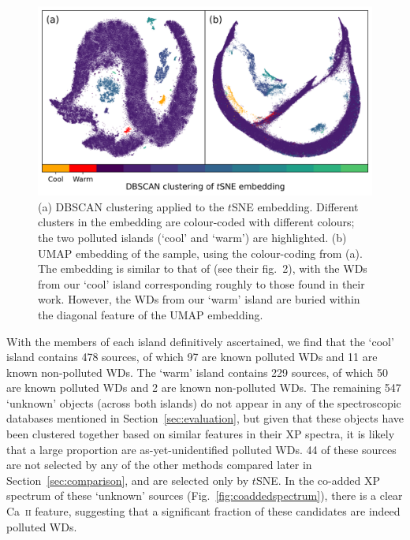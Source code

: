 \documentclass[fleqn,usenatbib]{rasti}
\begin{document}
\begin{figure}
\centering
\includegraphics[width=\textwidth]{figures/fig2_tsneclustering.png}
\caption{
    (a) DBSCAN clustering applied to the $t$SNE embedding.
    Different clusters in the embedding are colour-coded with different colours; the two polluted islands (`cool' and `warm') are highlighted.
    (b) UMAP embedding of the sample, using the colour-coding from (a).
    The embedding is similar to that of \citet{kao24} (see their fig.~2), with the WDs from our `cool' island corresponding roughly to those found in their work.
    However, the WDs from our `warm' island are buried within the diagonal feature of the UMAP embedding.
}
\label{fig:tsneclustering}
\end{figure}

With the members of each island definitively ascertained, we find that the `cool' island contains 478 sources, of which 97 are known polluted WDs and 11 are known non-polluted WDs.
The `warm' island contains 229 sources, of which 50 are known polluted WDs and 2 are known non-polluted WDs.
The remaining 547 `unknown' objects (across both islands) do not appear in any of the spectroscopic databases mentioned in Section~\ref{sec:evaluation}, but given that these objects have been clustered together based on similar features in their XP spectra, it is likely that a large proportion are as-yet-unidentified polluted WDs.
44 of these sources are not selected by any of the other methods compared later in Section~\ref{sec:comparison}, and are selected only by $t$SNE.
In the co-added XP spectrum of these `unknown' sources (Fig.~\ref{fig:coaddedspectrum}), there is a clear Ca~\textsc{ii} feature, suggesting that a significant fraction of these candidates are indeed polluted WDs.
\end{document}
